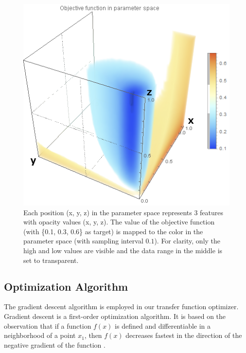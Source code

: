 \begin{figure}
	\centering
	\begin{minipage}{.6\textwidth}
		\includegraphics[width=1\linewidth]{images/nucleon_strong_red_parameterspace}
	\end{minipage}
	\caption[Each position (x, y, z) in the parameter space represents 3 features with opacity values (x, y, z).]{Each position (x, y, z) in the parameter space represents 3 features with opacity values (x, y, z). The value of the objective function (with \{0.1, 0.3, 0.6\} as target) is mapped to the color in the parameter space (with sampling interval $ 0.1 $). For clarity, only the high and low values are visible and the data range in the middle is set to transparent.}
	\label{fig:nucleon_parameterspace}
\end{figure}

\subsection{Optimization Algorithm}
The gradient descent algorithm is employed in our transfer function optimizer.
Gradient descent is a first-order optimization algorithm. It is based on the observation that if a function $ f(x) $ is defined and differentiable in a neighborhood of a point $ x_{1} $, then $ f(x) $ decreases fastest in the direction of the negative gradient of the function \cite{chong_introduction_2013}.

